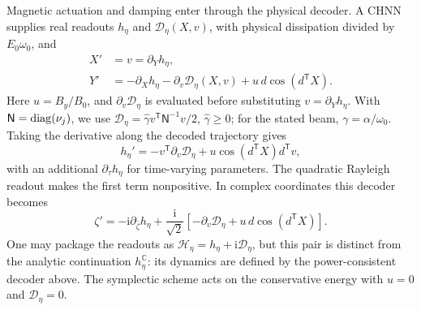 Magnetic actuation and damping enter through the physical decoder.
A CHNN supplies real readouts $h_\eta$ and $\mathcal D_\eta(X,v)$,
with physical dissipation divided by $E_0\omega_0$, and
\begin{align}
 X'&=v=\partial_Yh_\eta,\nonumber\\
 Y'&=-\partial_Xh_\eta-\partial_v\mathcal D_\eta(X,v)
       +u\,d\cos(d^{\mathsf T}X).
 \label{eq:fragment-decoder}
\end{align}
Here $u=B_y/B_0$, and $\partial_v\mathcal D_\eta$ is evaluated before
substituting $v=\partial_Yh_\eta$. With $\mathsf N=\operatorname{diag}(\nu_j)$, we use
$\mathcal D_\eta=\widehat\gamma v^{\mathsf T}\mathsf N^{-1}v/2$,
$\widehat\gamma\ge0$; for the stated beam, $\gamma=\alpha/\omega_0$.
Taking the derivative along the decoded trajectory gives
\begin{equation}
 h_\eta'=-v^{\mathsf T}\partial_v\mathcal D_\eta
       +u\cos(d^{\mathsf T}X)d^{\mathsf T}v,
 \label{eq:fragment-power}
\end{equation}
with an additional $\partial_\tau h_\eta$ for time-varying parameters.
The quadratic Rayleigh readout makes the first term nonpositive.
In complex coordinates this decoder becomes
\begin{equation}
 \zeta'=-\mathrm i\partial_{\bar\zeta}h_\eta
       +\frac{\mathrm i}{\sqrt2}
        [-\partial_v\mathcal D_\eta+u\,d\cos(d^{\mathsf T}X)].
 \label{eq:core-complex-dynamics}
\end{equation}
One may package the readouts as $\mathcal H_\eta=h_\eta+\mathrm i\mathcal D_\eta$,
but this pair is distinct from the analytic continuation $h_\eta^{\mathbb C}$:
its dynamics are defined by the power-consistent decoder above.
The symplectic scheme acts on the conservative energy with
$u=0$ and $\mathcal D_\eta=0$.

